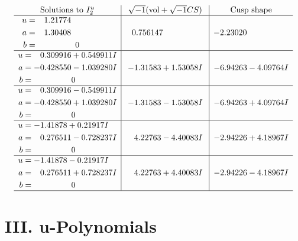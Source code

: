 \documentclass[1p]{elsarticle_modified}
\theoremstyle{definition}
\newcommand{\I}{\sqrt{-1}}
\begin{document}
$$\begin{array}{c|c|c}  
\text{Solutions to }I^u_{2}& \I (\text{vol} + \sqrt{-1}CS) & \text{Cusp shape}\\
 \hline 
\begin{aligned}
u &= \phantom{-}1.21774\phantom{ +0.000000I} \\
a &= \phantom{-}1.30408\phantom{ +0.000000I} \\
b &= \phantom{-0.000000 } 0\end{aligned}
 & \phantom{-}0.756147\phantom{ +0.000000I} & -2.23020\phantom{ +0.000000I} \\ \hline\begin{aligned}
u &= \phantom{-}0.309916 + 0.549911 I \\
a &= -0.428550 - 1.039280 I \\
b &= \phantom{-0.000000 } 0\end{aligned}
 & -1.31583 + 1.53058 I & -6.94263 - 4.09764 I \\ \hline\begin{aligned}
u &= \phantom{-}0.309916 - 0.549911 I \\
a &= -0.428550 + 1.039280 I \\
b &= \phantom{-0.000000 } 0\end{aligned}
 & -1.31583 - 1.53058 I & -6.94263 + 4.09764 I \\ \hline\begin{aligned}
u &= -1.41878 + 0.21917 I \\
a &= \phantom{-}0.276511 - 0.728237 I \\
b &= \phantom{-0.000000 } 0\end{aligned}
 & \phantom{-}4.22763 - 4.40083 I & -2.94226 + 4.18967 I \\ \hline\begin{aligned}
u &= -1.41878 - 0.21917 I \\
a &= \phantom{-}0.276511 + 0.728237 I \\
b &= \phantom{-0.000000 } 0\end{aligned}
 & \phantom{-}4.22763 + 4.40083 I & -2.94226 - 4.18967 I\\
 \hline 
 \end{array}$$\newpage
\newpage\renewcommand{\arraystretch}{1}
\centering \section*{ III. u-Polynomials}
\end{document}
